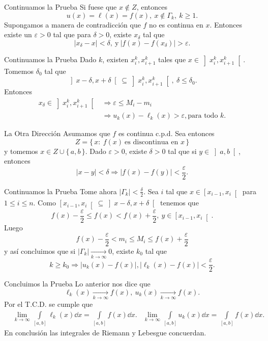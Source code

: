 \documentclass[utf8]{beamer}
\theoremstyle{plain}
\theoremstyle{definition}
\theoremstyle{remark}
\numberwithin{equation}{section}
\newcommand{\dl}{\delta}                %
\newcommand{\eps}{\varepsilon}          %
\newcommand{\Ga}{\Gamma}                %
\newcommand{\bonj}[1]{\left\lbrack#1\right\rbrack}
\newcommand{\obonj}[1]{\left\rbrack#1\right\lbrack}
\newcommand{\lbonj}[1]{\left\lbrack#1\right\lbrack}
\newcommand{\set}[1]{\{\,#1\,\}}    %
\renewcommand{\geq}{\geqslant}          %
\renewcommand{\l}{\ell}                   %
\renewcommand{\leq}{\leqslant}          %
\newcommand{\To}{\Rightarrow}
\renewcommand{\.}{\Cdot}                %
\begin{document}
\begin{frame}{Continuamos la Prueba}
  Si fuese que $x\not\in Z$, entonces 
  $$u(x)=\l(x)=f(x),\ x\not\in\Ga_k,\ k\geq 1.$$
  Supongamos a manera de contradicción que $f$ no es continua en $x$. Entonces existe un $\eps>0$ tal que para $\dl>0$, existe $x_\dl$ tal que 
  $$|x_\dl-x|<\dl,\ \text{y}\ |f(x)-f(x_\dl)|>\eps.$$
\end{frame}

  \begin{frame}{Continuamos la Prueba}
  Dado $k$, existen $x_i^k,x_{i+1}^k$ tales que $x\in\obonj{x_i^k,x_{i+1}^k}$. Tomemos $\dl_0$ tal que 
  $$\obonj{x-\dl,x+\dl}\subseteq\obonj{x_i^k,x_{i+1}^k},\ \dl\leq \dl_0.$$
  Entonces 
  \begin{align*}
    x_\dl\in\obonj{x_i^k,x_{i+1}^k}&\To \eps\leq M_i-m_i\\
    &\To u_k(x)-\l_k(x)>\eps, \text{para todo }k.
  \end{align*}
\end{frame}

\begin{frame}{La Otra Dirección}
  Asumamos que $f$ es continua c.p.d. Sea entonces 
  $$Z=\set{x:\ f(x)\ \text{es discontinua en }x}$$
  y tomemos $x\in Z\cup\set{a,b}$. Dado $\eps>0$, existe $\dl>0$ tal que si $y\in\obonj{a,b}$, entonces
  $$|x-y|<\dl\To|f(x)-f(y)|<\frac{\eps}{2}.$$
\end{frame}

\begin{frame}{Continuamos la Prueba}
  Tome ahora $|\Ga_k|<\frac{\dl}{2}$. Sea $i$ tal que $x\in \lbonj{x_{i-1},x_i}$ para $1\leq i\leq n$. Como $\lbonj{x_{i-1},x_i}\subseteq\obonj{x-\dl,x+\dl}$ tenemos que 
  $$f(x)-\frac{\eps}{2}\leq f(x)<f(x)+\frac{\eps}{2},\ y\in \lbonj{x_{i-1},x_i}.$$
  Luego 
  $$f(x)-\frac{\eps}{2}<m_i\leq M_i\leq f(x)+\frac{\eps}{2}$$
  y así concluimos que si $|\Ga_k|\xrightarrow[k\to\infty]{}0$, existe $k_0$ tal que 
  $$k\geq k_0\To |u_k(x)-f(x)|,|\l_k(x)-f(x)|<\frac{\eps}{2}.$$
\end{frame}

\begin{frame}{Concluimos la Prueba}
  Lo anterior nos dice que 
  $$\l_k(x)\xrightarrow[k\to\infty]{}f(x),\ u_k(x)\xrightarrow[k\to\infty]{}f(x).$$
  Por el T.C.D. se cumple que 
  \begin{align*}
    &\lim_{k\to\infty}\int\limits_{\bonj{a,b}}\l_k(x)\dd x=\int\limits_{\bonj{a,b}}f(x)\dd x.
    &\lim_{k\to\infty}\int\limits_{\bonj{a,b}}u_k(x)\dd x=\int\limits_{\bonj{a,b}}f(x)\dd x.
  \end{align*}
  En conclusión las integrales de Riemann y Lebesgue concuerdan.
\end{frame}
\end{document}
